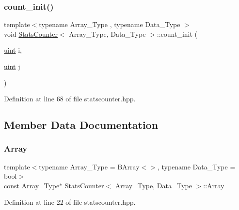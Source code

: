 \mbox{\label{class_stats_counter_a19bd5936619e190c0d8918b4f343922e}} 
\subsubsection{\texorpdfstring{count\+\_\+init()}{count\_init()}}
{\footnotesize\ttfamily template$<$typename Array\+\_\+\+Type , typename Data\+\_\+\+Type $>$ \\
void \hyperlink{class_stats_counter}{Stats\+Counter}$<$ Array\+\_\+\+Type, Data\+\_\+\+Type $>$\+::count\+\_\+init (\begin{DoxyParamCaption}\item[{\hyperlink{typedefs_8hpp_a91ad9478d81a7aaf2593e8d9c3d06a14}{uint}}]{i,  }\item[{\hyperlink{typedefs_8hpp_a91ad9478d81a7aaf2593e8d9c3d06a14}{uint}}]{j }\end{DoxyParamCaption})\hspace{0.3cm}{\ttfamily [inline]}}



Definition at line 68 of file statscounter.\+hpp.



\subsection{Member Data Documentation}
\mbox{\label{class_stats_counter_aa826cd748cd3b1a57cbec52424285485}} 
\subsubsection{\texorpdfstring{Array}{Array}}
{\footnotesize\ttfamily template$<$typename Array\+\_\+\+Type  = B\+Array$<$$>$, typename Data\+\_\+\+Type  = bool$>$ \\
const Array\+\_\+\+Type$\ast$ \hyperlink{class_stats_counter}{Stats\+Counter}$<$ Array\+\_\+\+Type, Data\+\_\+\+Type $>$\+::Array}



Definition at line 22 of file statscounter.\+hpp.

\mbox{\label{class_stats_counter_a42c926799d8cb0abc6f5a1cfbc073f69}} 
